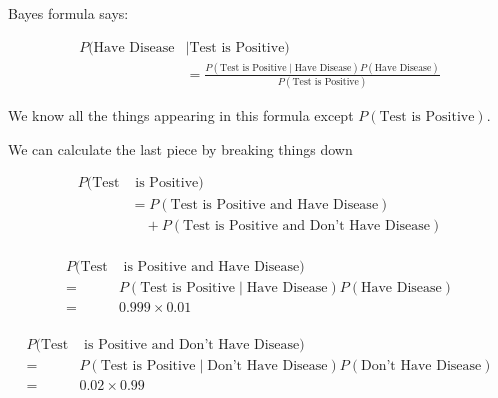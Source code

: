 %
\begin{frame}
Bayes formula says:

\begin{align*}
P(\text{Have Disease}  & \mid \text{Test is Positive)} \\
%
& = \frac{  P(\text{Test is
Positive} \mid \text{Have Disease}) P(\text{Have Disease}) } { P(\text{Test is
Positive}) }
\end{align*}

We know all the things appearing in this formula except $ P(\text{Test is
Positive}) $.

\end{frame}
%

%
\begin{frame}

We can calculate the last piece by breaking things down

\begin{align*}
P(\text{Test} & \text{ is Positive}) \\
%
&= P(\text{Test is Positive and Have Disease}) \\
%
& \quad + P(\text{Test is Positive and Don't Have Disease}) \\
\end{align*}

\end{frame}
%

%
\begin{frame}

\begin{align*}
P(\text{Test} & \text{ is Positive and Have Disease}) \\
%
=& P(\text{Test is Positive} \mid \text{Have Disease}) P(\text{Have Disease}) \\
=& 0.999 \times 0.01 \\
\end{align*}

\end{frame}
%

%
\begin{frame}

\begin{align*}
P(\text{Test} & \text{ is Positive and Don't Have Disease}) \\
%
=& P(\text{Test is Positive} \mid \text{Don't Have Disease}) P(\text{Don't Have Disease}) \\
=& 0.02 \times 0.99 \\
\end{align*}

\end{frame}


